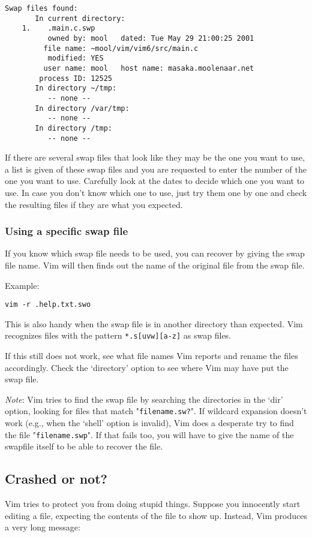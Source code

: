 \begin{Verbatim}[samepage=true]
    Swap files found: 
       In current directory: 
    1.    .main.c.swp 
          owned by: mool   dated: Tue May 29 21:00:25 2001 
         file name: ~mool/vim/vim6/src/main.c 
          modified: YES 
         user name: mool   host name: masaka.moolenaar.net 
        process ID: 12525 
       In directory ~/tmp: 
          -- none -- 
       In directory /var/tmp: 
          -- none -- 
       In directory /tmp: 
          -- none -- 
\end{Verbatim}

If there are several swap files that look like they may be the one you want to use, a list is given of these swap files and you are requested to enter the number of the one you want to use.
Carefully look at the dates to decide which one you want to use.
In case you don't know which one to use, just try them one by one and check the resulting files if they are what you expected.

\subsubsection{Using a specific swap file}
If you know which swap file needs to be used, you can recover by giving the swap file name.
Vim will then finds out the name of the original file from the swap file.

Example:
\begin{Verbatim}[samepage=true]
 vim -r .help.txt.swo
\end{Verbatim}

This is also handy when the swap file is in another directory than expected.
Vim recognizes files with the pattern \verb!*.s[uvw][a-z]! as swap files.

If this still does not work, see what file names Vim reports and rename the files accordingly.
Check the `directory' option to see where Vim may have put the swap file.

\emph{Note}: Vim tries to find the swap file by searching the directories in the `dir' option, looking for files that match "\verb!filename.sw?!".
If wildcard expansion doesn't work (e.g., when the `shell' option is invalid), Vim does a desperate try to find the file "\verb!filename.swp!".
If that fails too, you will have to give the name of the swapfile itself to be able to recover the file.
\subsection{Crashed or not?}
\label{ATTENTION}
\label{E325}
Vim tries to protect you from doing stupid things.
Suppose you innocently start editing a file, expecting the contents of the file to show up.
Instead, Vim produces a very long message:

